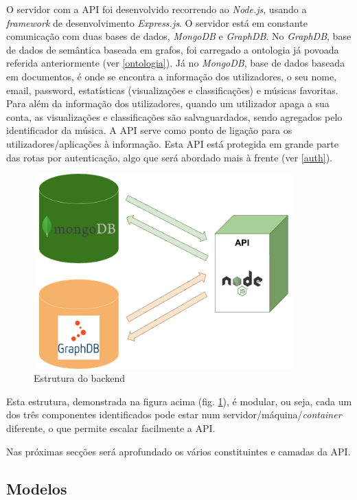 \documentclass{article}
\begin{document}
O servidor com a API foi desenvolvido recorrendo ao \textit{Node.js}, usando a \textit{framework} de desenvolvimento \textit{Express.js}. O servidor está em constante comunicação com duas bases de dados, \textit{MongoDB} e \textit{GraphDB}. No \textit{GraphDB}, base de dados de semântica baseada em grafos, foi carregado a ontologia já povoada referida anteriormente (ver \ref{ontologia}). Já no \textit{MongoDB}, base de dados baseada em documentos, é onde se encontra a informação dos utilizadores, o seu nome, email, password, estatísticas (visualizações e classificações) e músicas favoritas. Para além da informação dos utilizadores, quando um utilizador apaga a sua conta, as visualizações e classificações são salvaguardados, sendo agregados pelo identificador da música. A API serve como ponto de ligação para os utilizadores/aplicações à informação. Esta API está protegida em grande parte das rotas por autenticação, algo que será abordado mais à frente (ver \ref{auth}).

\begin{figure}[H]
    \centering
    \includegraphics[width=10cm]{Pictures/backend.png}
    \caption{Estrutura do backend}
    \label{backend}
\end{figure}

Esta estrutura, demonstrada na figura acima (fig. \ref{backend}), é modular, ou seja, cada um dos três componentes identificados pode estar num servidor/máquina/\textit{container} diferente, o que permite escalar facilmente a API.

Nas próximas secções será aprofundado os vários constituintes e camadas da API.

\subsection{Modelos}
\end{document}
